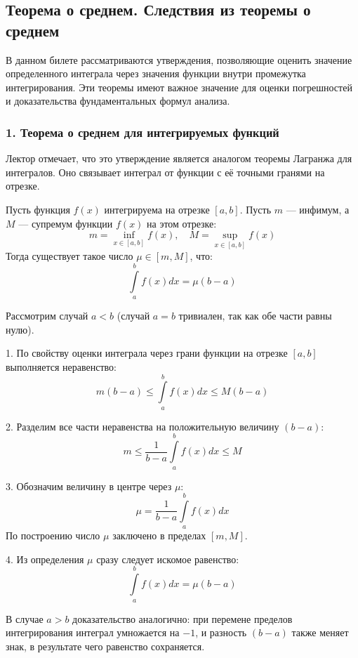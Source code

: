 \subsection{Теорема о среднем. Следствия из теоремы о среднем}

В данном билете рассматриваются утверждения, позволяющие оценить значение определенного интеграла через значения функции внутри промежутка интегрирования. Эти теоремы имеют важное значение для оценки погрешностей и доказательства фундаментальных формул анализа.

\subsubsection*{1. Теорема о среднем для интегрируемых функций}

Лектор отмечает, что это утверждение является аналогом теоремы Лагранжа для интегралов. Оно связывает интеграл от функции с её точными гранями на отрезке.

\begin{theorem}
Пусть функция $f(x)$ интегрируема на отрезке $[a, b]$. Пусть $m$ — инфимум, а $M$ — супремум функции $f(x)$ на этом отрезке:
\[ m = \inf_{x \in [a, b]} f(x), \quad M = \sup_{x \in [a, b]} f(x) \]
Тогда существует такое число $\mu \in [m, M]$, что:
\[ \int\limits_a^b f(x) dx = \mu (b - a) \]
\end{theorem}

\begin{tcolorbox}[title=Доказательство, breakable]
Рассмотрим случай $a < b$ (случай $a = b$ тривиален, так как обе части равны нулю).

1. По свойству оценки интеграла через грани функции на отрезке $[a, b]$ выполняется неравенство:
\[ m(b - a) \le \int\limits_a^b f(x) dx \le M(b - a) \]

2. Разделим все части неравенства на положительную величину $(b - a)$:
\[ m \le \frac{1}{b - a} \int\limits_a^b f(x) dx \le M \]

3. Обозначим величину в центре через $\mu$:
\[ \mu = \frac{1}{b - a} \int\limits_a^b f(x) dx \]
По построению число $\mu$ заключено в пределах $[m, M]$. 

4. Из определения $\mu$ сразу следует искомое равенство:
\[ \int\limits_a^b f(x) dx = \mu (b - a) \]

В случае $a > b$ доказательство аналогично: при перемене пределов интегрирования интеграл умножается на $-1$, и разность $(b-a)$ также меняет знак, в результате чего равенство сохраняется.
\end{tcolorbox}

